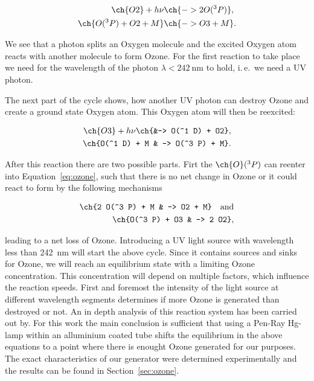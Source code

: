 \begin{align}
  \ch{O2} + h\nu &\ch{-> 2 O(^3P)},\nonumber\\
  \ch{O(^3 P) + O2 + M} &\ch{-> O3 + M}. \label{eq:ozone}
\end{align}

We see that a photon splits an Oxygen molecule and the excited
Oxygen atom reacts with another  molecule to form Ozone. For
the first reaction to take place we need for the wavelength of the
photon $\lambda < \SI{242}{\nano\meter}$ to hold, i.\,e.\ we need a UV
photon. 

The next part of the cycle shows, how another UV photon can destroy
Ozone and create a ground state Oxygen atom. This Oxygen atom will
then be reexcited:

\begin{align}
  \ch{O3} + h\nu \ch{&-> O(^1 D) +
  O2}, \label{eq:split}\\
  \ch{O(^1 D) + M & -> O(^3 P) + M}.\nonumber
\end{align}

After this reaction there are two possible parts. Firt the $\ch{O}(^3
P)$ can reenter into Equation~\eqref{eq:ozone}, such that there is no
net change in Ozone or it could react to form  by the
following mechanisms

\begin{align*}
  \ch{2 O(^3 P) + M & -> O2 + M} \quad \text{and}\\
  \ch{O(^3 P) + O3 & -> 2 O2},
\end{align*}

leading to a net loss of Ozone. Introducing a UV light source with
wavelength less than \SI{242}{\nano\meter} will start the above
cycle. Since it contains sources and sinks for Ozone, we will reach an
equilibrium state with a limiting Ozone concentration. This
concentration will depend on multiple factors, which influence the
reaction speeds. First and foremost the intensity of the light source
at different wavelength segments determines if more Ozone is generated
than destroyed or not. An in depth analysis of this reaction system
has been carried out by. For this work the main conclusion
is sufficient that using a Pen-Ray Hg-lamp within an alluminium coated
tube shifts the equilibrium in the above equations to a point where
there is enought Ozone generated for our purposes. The exact
characteristics of our generator were determined experimentally and
the results can be found in Section~\ref{sec:ozone}. 

